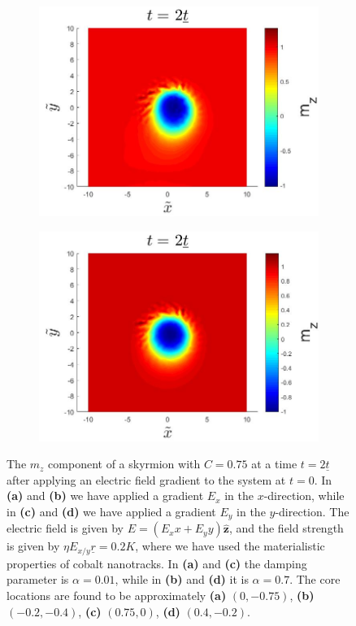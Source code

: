 \begin{figure}[h!]
\begin{subfigure}{.45\textwidth}
  \centering
  \includegraphics[width=\linewidth]{Figures/SkyrmionEyA001.jpg}
  \caption{}
\end{subfigure}
\begin{subfigure}{.45\textwidth}
  \centering
  \includegraphics[width=\linewidth]{Figures/SkyrmionEyA07.jpg}
  \caption{}
\end{subfigure}
\caption{The $m_z$ component of a skyrmion with $C=0.75$ at a time $t=2\underline{t}$ after applying an electric field gradient to the system at $t=0$. In \textbf{(a)} and \textbf{(b)} we have applied a gradient $E_x$ in the $x$-direction, while in \textbf{(c)} and \textbf{(d)} we have applied a gradient $E_y$ in the $y$-direction. The electric field is given by $E = (E_x x+E_yy)\mathbold{\hat{z}}$, and the field strength is given by $\eta E_{x/y}\underline{r} = 0.2 K$, where we have used the materialistic properties of cobalt nanotracks. In \textbf{(a)} and \textbf{(c)} the damping parameter is $\alpha = 0.01$, while in \textbf{(b)} and \textbf{(d)} it is $\alpha=0.7$. The core locations are found to be approximately \textbf{(a)} $\left(0,-0.75 \right)$, \textbf{(b)} $\left(-0.2,-0.4 \right)$, \textbf{(c)} $\left(0.75,0 \right)$, \textbf{(d)} $\left(0.4,-0.2 \right)$.}
\label{fig:SkyrmionEField}
\end{figure}

